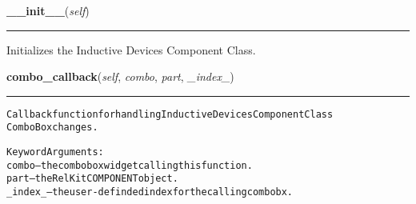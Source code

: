 \hspace{.8\funcindent}\begin{boxedminipage}{\funcwidth}

    \raggedright \textbf{\_\_init\_\_}(\textit{self})

    \vspace{-1.5ex}

    \rule{\textwidth}{0.5\fboxrule}
\setlength{\parskip}{2ex}
    Initializes the Inductive Devices Component Class.

\setlength{\parskip}{1ex}
    \end{boxedminipage}

    \label{reliafree:inductors:inductor:Inductor:combo_callback}

    \vspace{0.5ex}

\hspace{.8\funcindent}\begin{boxedminipage}{\funcwidth}

    \raggedright \textbf{combo\_callback}(\textit{self}, \textit{combo}, \textit{part}, \textit{\_index\_})

    \vspace{-1.5ex}

    \rule{\textwidth}{0.5\fboxrule}
\setlength{\parskip}{2ex}
\begin{alltt}
Callback function for handling Inductive Devices Component Class
ComboBox changes.

Keyword Arguments:
  combo -- the combobox widget calling this function.
   part -- the RelKit COMPONENT object.
\_index\_ -- the user-definded index for the calling combobx.
\end{alltt}

\setlength{\parskip}{1ex}
    \end{boxedminipage}

    \label{reliafree:inductors:inductor:Inductor:create_reliability_inputs}

    \vspace{0.5ex}

